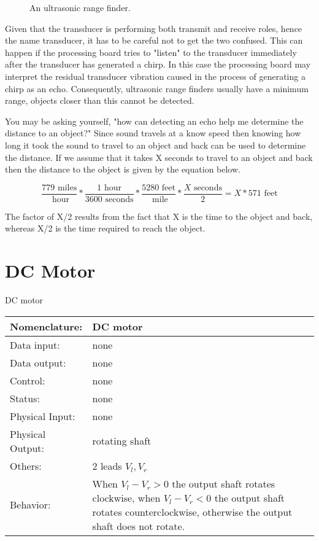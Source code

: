 \begin{figure}[ht]
\caption{An ultrasonic range finder.}
\label{fig:commonPeripheralComponentsultra}
\end{figure}

Given that the transducer is performing both transmit and receive
roles, hence the name transducer, it has to be careful not to get 
the two confused.  This can
happen if the processing board tries to "listen" to the transducer
immediately after the transducer has generated a chirp.  In this case
the processing board may interpret the residual transducer vibration
caused in the process of generating a chirp as an echo.  Consequently,
ultrasonic range finders 
usually have a minimum range, objects closer than this cannot be detected.

You may be asking yourself, "how can detecting an echo help me determine
the distance to an object?"  Since sound travels at a know speed
then knowing how long it took the sound to travel
to an object and back can be used to determine the distance.  If we assume
that it takes X seconds to travel to an object and back then the distance
to the object is given by the equation below.

$$	\frac{779 \text{ \ miles}}{\text{ \ hour}} * 
    \frac{1 \text{ \ hour}} {3600 \text{ \ seconds}} * 
    \frac{5280 \text{ \ feet}}{\text{ \ mile}} * 
    \frac{X \text{ \ seconds}}{2} =
    X * 571 \text{ \ feet} $$

The factor of X/2 results from the fact that X is the time to the 
object and back, whereas X/2 is the time required to reach the object. 




\section{DC Motor}
\label{page:dvmotor}
\begin{buildingblock}{DC motor}
\begin{tabular}{|l|p{3.5in}|} \hline
Nomenclature:  & DC motor  \\ \hline
Data input:    & none    \\ \hline
Data output:   & none     \\ \hline
Control:       & none     \\ \hline
Status:        & none      \\ \hline
Physical Input:& none		\\ \hline
Physical Output:& rotating shaft		\\ \hline
Others:        & 2 leads $V_l, V_r$      \\ \hline
Behavior:      & When $V_l-V_r > 0$ the output shaft rotates clockwise, 
when $V_l-V_r < 0$ the output shaft rotates counterclockwise, otherwise the
output shaft does not rotate. \\ \hline
\end{tabular}
\end{buildingblock}


